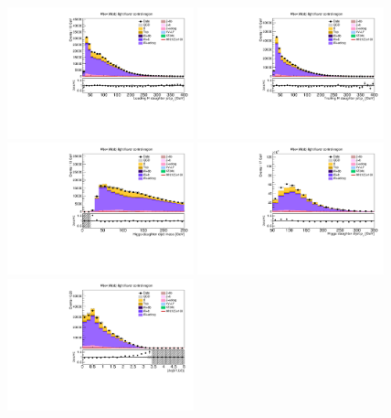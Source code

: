 \begin{figure}[tbp]
  \begin{center}
    \includegraphics[width=0.48\textwidth]{figures/wlnhbb2016/resolved/WenWHLightFlavorCR_Hbjet1Pt.pdf}
    \includegraphics[width=0.48\textwidth]{figures/wlnhbb2016/resolved/WenWHLightFlavorCR_Hbjet2Pt.pdf}
    \includegraphics[width=0.48\textwidth]{figures/wlnhbb2016/resolved/WenWHLightFlavorCR_mH.pdf}
    \includegraphics[width=0.48\textwidth]{figures/wlnhbb2016/resolved/WenWHLightFlavorCR_pTH.pdf}
    \includegraphics[width=0.48\textwidth]{figures/wlnhbb2016/resolved/WenWHLightFlavorCR_dEtab1b2.pdf}

\end{center}
\end{figure}
